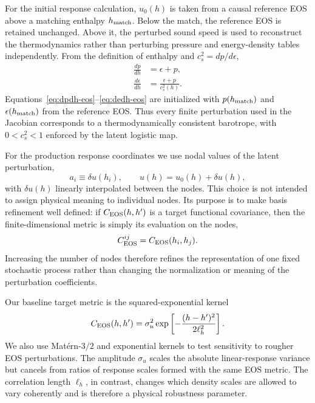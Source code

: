 For the initial response calculation, \(u_0(h)\) is taken from a causal
reference EOS above a matching enthalpy \(h_{\rm match}\).  Below the match,
the reference EOS is retained unchanged.  Above it, the perturbed sound speed
is used to reconstruct the thermodynamics rather than perturbing pressure and
energy-density tables independently.  From the definition of enthalpy and
\(c_s^2=dp/d\epsilon\),
\begin{align}
    \frac{dp}{dh}
    &=
    \epsilon+p,
    \label{eq:dpdh-eos}
    \\
    \frac{d\epsilon}{dh}
    &=
    \frac{\epsilon+p}{c_s^2(h)}.
    \label{eq:dedh-eos}
\end{align}
Equations~\eqref{eq:dpdh-eos}--\eqref{eq:dedh-eos} are initialized with
\(p(h_{\rm match})\) and \(\epsilon(h_{\rm match})\) from the reference EOS.
Thus every finite perturbation used in the Jacobian corresponds to a
thermodynamically consistent barotrope, with \(0<c_s^2<1\) enforced by the
latent logistic map.

For the production response coordinates we use nodal values of the latent
perturbation,
\begin{equation}
    a_i \equiv \delta u(h_i),
    \qquad
    u(h)=u_0(h)+\delta u(h),
    \label{eq:nodal-coordinates}
\end{equation}
with \(\delta u(h)\) linearly interpolated between the nodes.  This choice is
not intended to assign physical meaning to individual nodes.  Its purpose is
to make basis refinement well defined: if \(C_{\rm EOS}(h,h')\) is a target
functional covariance, then the finite-dimensional metric is simply its
evaluation on the nodes,
\begin{equation}
    C_{\rm EOS}^{ij}
    =
    C_{\rm EOS}(h_i,h_j).
    \label{eq:nodal-covariance}
\end{equation}
Increasing the number of nodes therefore refines the representation of one
fixed stochastic process rather than changing the normalization or meaning
of the perturbation coefficients.

Our baseline target metric is the squared-exponential kernel
\begin{equation}
    C_{\rm EOS}(h,h')
    =
    \sigma_u^2
    \exp\left[
      -\frac{(h-h')^2}{2\ell_h^2}
    \right].
    \label{eq:eos-covariance}
\end{equation}
We also use Mat\'ern-\(3/2\) and exponential kernels to test sensitivity to
rougher EOS perturbations.  The amplitude \(\sigma_u\) scales the absolute
linear-response variance but cancels from ratios of response scales formed
with the same EOS metric.  The correlation length \(\ell_h\), in contrast,
changes which density scales are allowed to vary coherently and is therefore
a physical robustness parameter.

